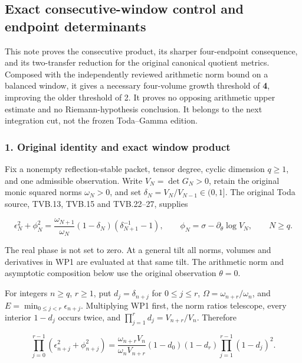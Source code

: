 \subsection{Exact consecutive-window control and endpoint determinants}\label{endpoint-window_product_owner--exact-consecutive-window-control-and-endpoint-determinants}

This note proves the consecutive product, its sharper four-endpoint consequence, and its two-transfer reduction for the original canonical quotient metrics. Composed with the independently reviewed arithmetic norm bound on a balanced window, it gives a necessary four-volume growth threshold of \textbf{4}, improving the older threshold of 2. It proves no opposing arithmetic upper estimate and no Riemann-hypothesis conclusion. It belongs to the next integration cut, not the frozen Toda--Gamma edition.

\subsubsection{1. Original identity and exact window product}\label{endpoint-window_product_owner--original-identity-and-exact-window-product}

Fix a nonempty reflection-stable packet, tensor degree, cyclic dimension \(q\ge1\), and one admissible observation. Write \(V_N=\det G_N>0\), retain the original monic squared norms \(\omega_N>0\), and set \(\delta_N=V_N/V_{N-1}\in(0,1]\). The original Toda source, TVB.13, TVB.15 and TVB.22--27, supplies

\[
\epsilon_N^2+\phi_N^2
=\frac{\omega_{N+1}}{\omega_N}(1-\delta_N)(\delta_{N+1}^{-1}-1),
\qquad \phi_N=\sigma-\partial_\theta\log V_N,\qquad N\ge q. \tag{WP1}
\]

The real phase is not set to zero. At a general tilt all norms, volumes and derivatives in WP1 are evaluated at that same tilt. The arithmetic norm and asymptotic composition below use the original observation \(\theta=0\).

For integers \(n\ge q\), \(r\ge1\), put \(d_j=\delta_{n+j}\) for \(0\le j\le r\), \(\Omega=\omega_{n+r}/\omega_n\), and \(E=\min_{0\le j<r}\epsilon_{n+j}\). Multiplying WP1 first, the norm ratios telescope, every interior \(1-d_j\) occurs twice, and \(\prod_{j=1}^r d_j=V_{n+r}/V_n\). Therefore

\[
\boxed{\prod_{j=0}^{r-1}(\epsilon_{n+j}^2+\phi_{n+j}^2)
=\frac{\omega_{n+r}V_n}{\omega_nV_{n+r}}
(1-d_0)(1-d_r)\prod_{j=1}^{r-1}(1-d_j)^2.} \tag{WP2}
\]

